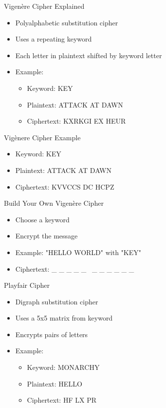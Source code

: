 \begin{withoutheadline}
\begin{frame}{Vigenère Cipher Explained}
\begin{itemize}
    \item Polyalphabetic substitution cipher
    \item Uses a repeating keyword
    \item Each letter in plaintext shifted by keyword letter
    \item Example:
    \begin{itemize}
        \item Keyword: KEY
        \item Plaintext: ATTACK AT DAWN
        \item Ciphertext: KXRKGI EX HEUR
    \end{itemize}
\end{itemize}
\end{frame}

\begin{frame}{Vigènere Cipher Example}
\begin{itemize}
    \item Keyword: KEY
    \item Plaintext: ATTACK AT DAWN
    \item Ciphertext: KVVCCS DC HCPZ
\end{itemize}
\end{frame}

\begin{frame}{Build Your Own Vigenère Cipher}
\begin{itemize}
    \item Choose a keyword
   \item Encrypt the message
   \item Example: "HELLO WORLD" with "KEY"
   \item Ciphertext: \_ \_ \_ \_ \_ \ \_ \_ \_ \_ \_ \_
\end{itemize}
\end{frame}

\begin{frame}{Playfair Cipher}
\begin{itemize}
    \item Digraph substitution cipher
    \item Uses a 5x5 matrix from keyword
    \item Encrypts pairs of letters
    \item Example:
    \begin{itemize}
        \item Keyword: MONARCHY
        \item Plaintext: HELLO
        \item Ciphertext: HF LX PR
    \end{itemize}
\end{itemize}
\end{frame}


\end{withoutheadline}
